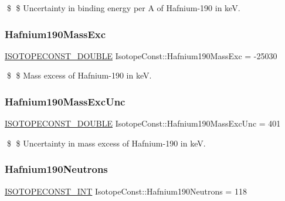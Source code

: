 \$ \$ Uncertainty in binding energy per A of Hafnium-\/190 in keV. \mbox{\label{group___isotope_const-_hafnium-_hf190_gad6281c82915b50b039f58543da126bbc}} 
\subsubsection{\texorpdfstring{Hafnium190\+Mass\+Exc}{Hafnium190MassExc}}
{\footnotesize\ttfamily \mbox{\hyperlink{group___isotope_const-_macros_ga8f45a7272ce02c0b4c65c44636ed719a}{I\+S\+O\+T\+O\+P\+E\+C\+O\+N\+S\+T\+\_\+\+D\+O\+U\+B\+LE}} Isotope\+Const\+::\+Hafnium190\+Mass\+Exc = -\/25030}

\$ \$ Mass excess of Hafnium-\/190 in keV. \mbox{\label{group___isotope_const-_hafnium-_hf190_ga2252e6c9233f94d0a99bd22c3f125dd4}} 
\subsubsection{\texorpdfstring{Hafnium190\+Mass\+Exc\+Unc}{Hafnium190MassExcUnc}}
{\footnotesize\ttfamily \mbox{\hyperlink{group___isotope_const-_macros_ga8f45a7272ce02c0b4c65c44636ed719a}{I\+S\+O\+T\+O\+P\+E\+C\+O\+N\+S\+T\+\_\+\+D\+O\+U\+B\+LE}} Isotope\+Const\+::\+Hafnium190\+Mass\+Exc\+Unc = 401}

\$ \$ Uncertainty in mass excess of Hafnium-\/190 in keV. \mbox{\label{group___isotope_const-_hafnium-_hf190_ga0aeb2be44ac81eca2ac973290fe6631b}} 
\subsubsection{\texorpdfstring{Hafnium190\+Neutrons}{Hafnium190Neutrons}}
{\footnotesize\ttfamily \mbox{\hyperlink{group___isotope_const-_macros_ga5f18360b3e99483a35c32d789e62621c}{I\+S\+O\+T\+O\+P\+E\+C\+O\+N\+S\+T\+\_\+\+I\+NT}} Isotope\+Const\+::\+Hafnium190\+Neutrons = 118}

